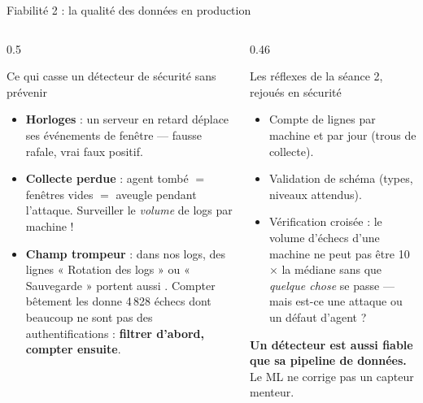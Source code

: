 \begin{frame}{Fiabilité 2 : la qualité des données en production}
\footnotesize%
\begin{columns}[t]
\begin{column}{0.5\textwidth}
\begin{block}{Ce qui casse un détecteur de sécurité sans prévenir}
\begin{itemize}
\item \textbf{Horloges} : un serveur en retard déplace ses événements de
fenêtre --- fausse rafale, vrai faux positif.
\item \textbf{Collecte perdue} : agent tombé $=$ fenêtres vides $=$
aveugle pendant l'attaque. Surveiller le \emph{volume} de logs par machine !
\item \textbf{Champ trompeur} : dans nos logs, des lignes « Rotation des
logs » ou « Sauvegarde » portent aussi .
Compter bêtement les  donne 4\,828 échecs dont beaucoup ne sont
pas des authentifications : \textbf{filtrer d'abord, compter ensuite}.
\end{itemize}
\end{block}
\end{column}
\begin{column}{0.46\textwidth}
\begin{block}{Les réflexes de la séance 2, rejoués en sécurité}
\begin{itemize}
\item Compte de lignes par machine et par jour (trous de collecte).
\item Validation de schéma (types, niveaux attendus).
\item Vérification croisée : le volume d'échecs d'une machine ne peut pas
être 10$\times$ la médiane sans que \emph{quelque chose} se passe ---
mais est-ce une attaque ou un défaut d'agent ?
\end{itemize}
\end{block}
\begin{kbox}[Règle]
\textbf{Un détecteur est aussi fiable que sa pipeline de données.}
Le ML ne corrige pas un capteur menteur.
\end{kbox}
\end{column}
\end{columns}
\end{frame}

